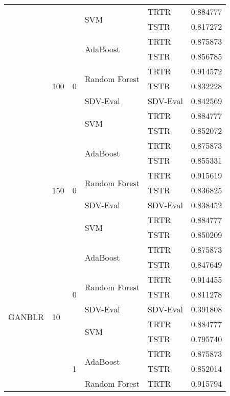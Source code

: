 \begin{longtable}{lllllr}
\cline{4-6}
 &  &  & \multirow[t]{2}{*}{SVM} & TRTR & 0.884777 \\
 &  &  &  & TSTR & 0.817272 \\
\cline{2-6} \cline{3-6} \cline{4-6}
 & \multirow[t]{7}{*}{100} & \multirow[t]{7}{*}{0} & \multirow[t]{2}{*}{AdaBoost} & TRTR & 0.875873 \\
 &  &  &  & TSTR & 0.856785 \\
\cline{4-6}
 &  &  & \multirow[t]{2}{*}{Random Forest} & TRTR & 0.914572 \\
 &  &  &  & TSTR & 0.832228 \\
\cline{4-6}
 &  &  & SDV-Eval & SDV-Eval & 0.842569 \\
\cline{4-6}
 &  &  & \multirow[t]{2}{*}{SVM} & TRTR & 0.884777 \\
 &  &  &  & TSTR & 0.852072 \\
\cline{2-6} \cline{3-6} \cline{4-6}
 & \multirow[t]{7}{*}{150} & \multirow[t]{7}{*}{0} & \multirow[t]{2}{*}{AdaBoost} & TRTR & 0.875873 \\
 &  &  &  & TSTR & 0.855331 \\
\cline{4-6}
 &  &  & \multirow[t]{2}{*}{Random Forest} & TRTR & 0.915619 \\
 &  &  &  & TSTR & 0.836825 \\
\cline{4-6}
 &  &  & SDV-Eval & SDV-Eval & 0.838452 \\
\cline{4-6}
 &  &  & \multirow[t]{2}{*}{SVM} & TRTR & 0.884777 \\
 &  &  &  & TSTR & 0.850209 \\
\cline{1-6} \cline{2-6} \cline{3-6} \cline{4-6}
\multirow[t]{70}{*}{GANBLR} & \multirow[t]{14}{*}{10} & \multirow[t]{7}{*}{0} & \multirow[t]{2}{*}{AdaBoost} & TRTR & 0.875873 \\
 &  &  &  & TSTR & 0.847649 \\
\cline{4-6}
 &  &  & \multirow[t]{2}{*}{Random Forest} & TRTR & 0.914455 \\
 &  &  &  & TSTR & 0.811278 \\
\cline{4-6}
 &  &  & SDV-Eval & SDV-Eval & 0.391808 \\
\cline{4-6}
 &  &  & \multirow[t]{2}{*}{SVM} & TRTR & 0.884777 \\
 &  &  &  & TSTR & 0.795740 \\
\cline{3-6} \cline{4-6}
 &  & \multirow[t]{7}{*}{1} & \multirow[t]{2}{*}{AdaBoost} & TRTR & 0.875873 \\
 &  &  &  & TSTR & 0.852014 \\
\cline{4-6}
 &  &  & \multirow[t]{2}{*}{Random Forest} & TRTR & 0.915794 \\

\end{longtable}
